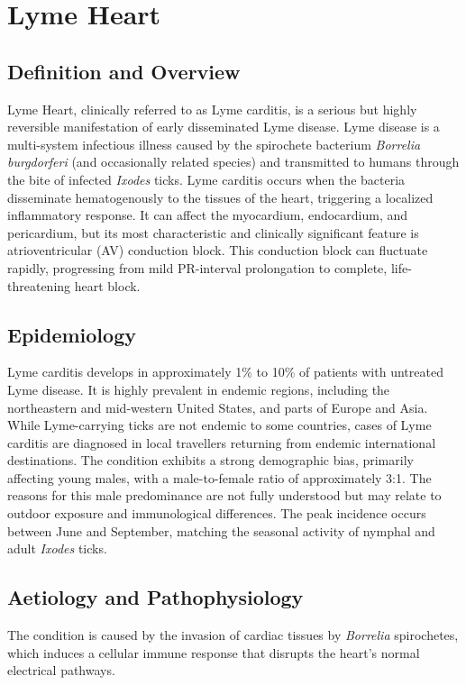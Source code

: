 \chapter{Lyme Heart}

\section*{Definition and Overview}
Lyme Heart, clinically referred to as Lyme carditis, is a serious but highly reversible manifestation of early disseminated Lyme disease. Lyme disease is a multi-system infectious illness caused by the spirochete bacterium \textit{Borrelia burgdorferi} (and occasionally related species) and transmitted to humans through the bite of infected \textit{Ixodes} ticks. Lyme carditis occurs when the bacteria disseminate hematogenously to the tissues of the heart, triggering a localized inflammatory response. It can affect the myocardium, endocardium, and pericardium, but its most characteristic and clinically significant feature is atrioventricular (AV) conduction block. This conduction block can fluctuate rapidly, progressing from mild PR-interval prolongation to complete, life-threatening heart block.

\section*{Epidemiology}
Lyme carditis develops in approximately 1\% to 10\% of patients with untreated Lyme disease. It is highly prevalent in endemic regions, including the northeastern and mid-western United States, and parts of Europe and Asia. While Lyme-carrying ticks are not endemic to some countries, cases of Lyme carditis are diagnosed in local travellers returning from endemic international destinations. The condition exhibits a strong demographic bias, primarily affecting young males, with a male-to-female ratio of approximately 3:1. The reasons for this male predominance are not fully understood but may relate to outdoor exposure and immunological differences. The peak incidence occurs between June and September, matching the seasonal activity of nymphal and adult \textit{Ixodes} ticks.

\section*{Aetiology and Pathophysiology}
The condition is caused by the invasion of cardiac tissues by \textit{Borrelia} spirochetes, which induces a cellular immune response that disrupts the heart's normal electrical pathways.

